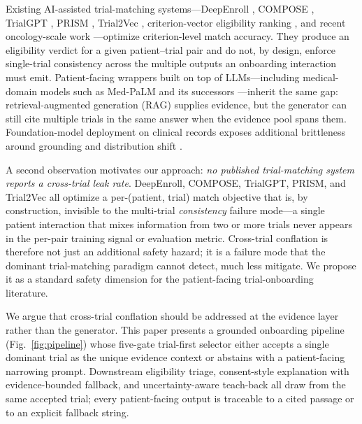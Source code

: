 \documentclass[11pt]{article}
\begin{document}
Existing AI-assisted trial-matching systems---DeepEnroll \citep{zhang2020deepenroll}, COMPOSE \citep{gao2020compose}, TrialGPT \citep{jin2024trialgpt}, PRISM \citep{gupta2024prism}, Trial2Vec \citep{wang2023trial2vec}, criterion-vector eligibility ranking \citep{bustos2018trial}, and recent oncology-scale work \citep{wong2024scaling,nievas2024distilling,chen2025enhancing}---optimize criterion-level match accuracy. They produce an eligibility verdict for a given patient--trial pair and do not, by design, enforce single-trial consistency across the multiple outputs an onboarding interaction must emit. Patient-facing wrappers built on top of LLMs---including medical-domain models such as Med-PaLM and its successors \citep{singhal2023medpalm,singhal2025medpalm2,lievin2024can}---inherit the same gap: retrieval-augmented generation (RAG) \citep{lewis2020rag,karpukhin2020dpr,thakur2021beir,zhao2025medrag,xiong2024benchmarking,neha2025ragsystematic} supplies evidence, but the generator can still cite multiple trials in the same answer when the evidence pool spans them. Foundation-model deployment on clinical records exposes additional brittleness around grounding and distribution shift \citep{wornow2023shaky,topol2019deep,obermeyer2019dissecting}.

A second observation motivates our approach: \emph{no published trial-matching system reports a cross-trial leak rate}. DeepEnroll, COMPOSE, TrialGPT, PRISM, and Trial2Vec all optimize a per-(patient, trial) match objective that is, by construction, invisible to the multi-trial \emph{consistency} failure mode---a single patient interaction that mixes information from two or more trials never appears in the per-pair training signal or evaluation metric. Cross-trial conflation is therefore not just an additional safety hazard; it is a failure mode that the dominant trial-matching paradigm cannot detect, much less mitigate. We propose it as a standard safety dimension for the patient-facing trial-onboarding literature.

We argue that cross-trial conflation should be addressed at the evidence layer rather than the generator. This paper presents a grounded onboarding pipeline (Fig.~\ref{fig:pipeline}) whose five-gate trial-first selector either accepts a single dominant trial as the unique evidence context or abstains with a patient-facing narrowing prompt. Downstream eligibility triage, consent-style explanation with evidence-bounded fallback, and uncertainty-aware teach-back all draw from the same accepted trial; every patient-facing output is traceable to a cited passage or to an explicit fallback string.
\end{document}
